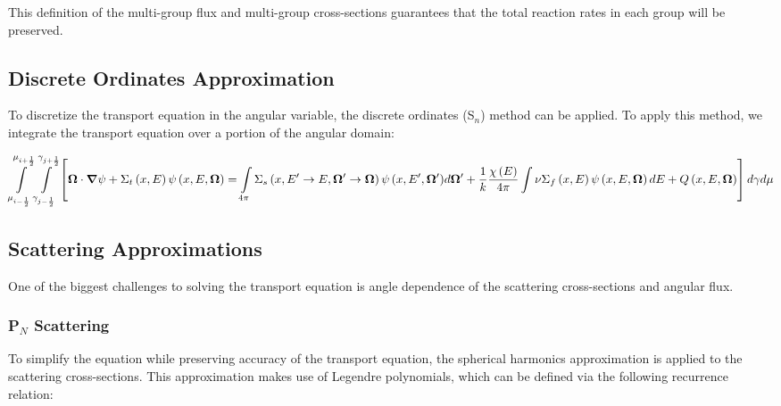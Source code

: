 This definition of the multi-group flux and multi-group cross-sections guarantees that the total reaction rates in each group will be preserved.


\subsection{Discrete Ordinates Approximation}

To discretize the transport equation in the angular variable, the discrete ordinates (S$_n$) method can be applied.  To apply this method, we integrate the transport equation over a portion of the angular domain:

\begin{dmath}
\intop_{\mu_{i-\frac{1}{2}}}^{\mu_{i+\frac{1}{2}}}\intop_{\gamma_{j-\frac{1}{2}}}^{\gamma_{j+\frac{1}{2}}} \left[ \bm \Omega \cdot \bm \nabla \psi + \Sigma_t\left(x,E\right)\psi\left(x,E,\bm \Omega\right) = \intop_{4\pi} \Sigma_s\left(x,E' \rightarrow E, \bm \Omega' \rightarrow \bm \Omega\right) {\psi\left(x,E',\bm \Omega'\right)} d\bm \Omega' + \frac{1}{k}\frac{\chi\left(E\right)}{4\pi} \intop \nu \Sigma_f\left(x,E\right) \psi\left(x,E,\bm \Omega\right) dE + Q\left(x,E,\bm \Omega\right) \right] d\gamma d\mu
\end{dmath}


\subsection{Scattering Approximations}

One of the biggest challenges to solving the transport equation is angle dependence of the scattering cross-sections and angular flux.

\subsubsection{P$_N$ Scattering}

  To simplify the equation while preserving accuracy of the transport equation, the spherical harmonics approximation is applied to the scattering cross-sections.  This approximation makes use of Legendre polynomials, which can be defined via the following recurrence relation:

